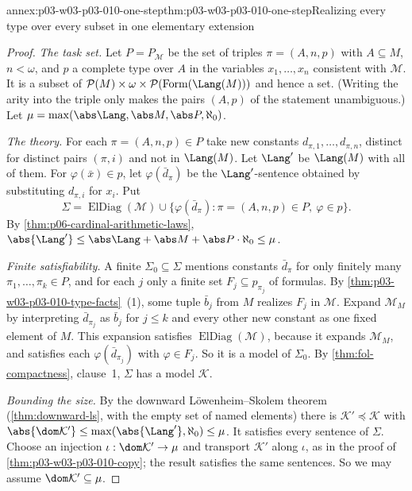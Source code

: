 \begin{annexitem}{annex:p03-w03-p03-010-one-step}{thm:p03-w03-p03-010-one-step}{Realizing every type over every subset in one elementary extension}
\begin{proof}
\emph{The task set.}  Let \(P=P_{\mathcal M}\) be the set of triples
\(\pi=(A,n,p)\) with \(A\subseteq M\), \(n<\omega\), and \(p\) a complete
type over \(A\) in the variables \(x_1,\ldots,x_n\) consistent with
\(\mathcal M\).  It is a subset of
\(\mathcal P(M)\times\omega\times\mathcal P(\operatorname{Form}(\Lang(M)))\)
and hence a set.  (Writing the arity into the triple only makes the pairs
\((A,p)\) of the statement unambiguous.)  Let
\(\mu=\max(\abs\Lang,\abs M,\abs P,\aleph_0)\).

\emph{The theory.}  For each \(\pi=(A,n,p)\in P\) take new constants
\(d_{\pi,1},\ldots,d_{\pi,n}\), distinct for distinct pairs \((\pi,i)\) and
not in \(\Lang(M)\).  Let \(\Lang'\) be \(\Lang(M)\) with all of them.  For
\(\varphi(\bar x)\in p\), let \(\varphi(\bar d_\pi)\) be the
\(\Lang'\)-sentence obtained by substituting \(d_{\pi,i}\) for \(x_i\).
Put
\[
  \Sigma=\operatorname{ElDiag}(\mathcal M)\cup
  \{\varphi(\bar d_\pi):\pi=(A,n,p)\in P,\ \varphi\in p\}.
\]
By \cref{thm:p06-cardinal-arithmetic-laws},
\(\abs{\Lang'}\leq\abs\Lang+\abs M+\abs P\cdot\aleph_0\leq\mu\).

\emph{Finite satisfiability.}  A finite \(\Sigma_0\subseteq\Sigma\)
mentions constants \(\bar d_\pi\) for only finitely many
\(\pi_1,\ldots,\pi_k\in P\), and for each \(j\) only a finite set
\(F_j\subseteq p_{\pi_j}\) of formulas.  By
\cref{thm:p03-w03-p03-010-type-facts}~(1), some tuple \(\bar b_j\) from
\(M\) realizes \(F_j\) in \(\mathcal M\).  Expand \(\mathcal M_M\) by
interpreting \(\bar d_{\pi_j}\) as \(\bar b_j\) for \(j\leq k\) and every
other new constant as one fixed element of \(M\).  This expansion satisfies
\(\operatorname{ElDiag}(\mathcal M)\), because it expands \(\mathcal M_M\),
and satisfies each \(\varphi(\bar d_{\pi_j})\) with \(\varphi\in F_j\).  So
it is a model of \(\Sigma_0\).  By \cref{thm:fol-compactness}, clause~1,
\(\Sigma\) has a model \(\mathcal K\).

\emph{Bounding the size.}  By the downward L\"owenheim--Skolem theorem
(\cref{thm:downward-ls}, with the empty set of named elements) there is
\(\mathcal K'\preccurlyeq\mathcal K\) with
\(\abs{\dom\mathcal K'}\leq\max(\abs{\Lang'},\aleph_0)\leq\mu\).  It
satisfies every sentence of \(\Sigma\).  Choose an injection
\(\iota:\dom\mathcal K'\to\mu\) and transport \(\mathcal K'\) along
\(\iota\), as in the proof of \cref{thm:p03-w03-p03-010-copy}; the result
satisfies the same sentences.  So we may assume
\(\dom\mathcal K'\subseteq\mu\).


\end{proof}
\end{annexitem}
